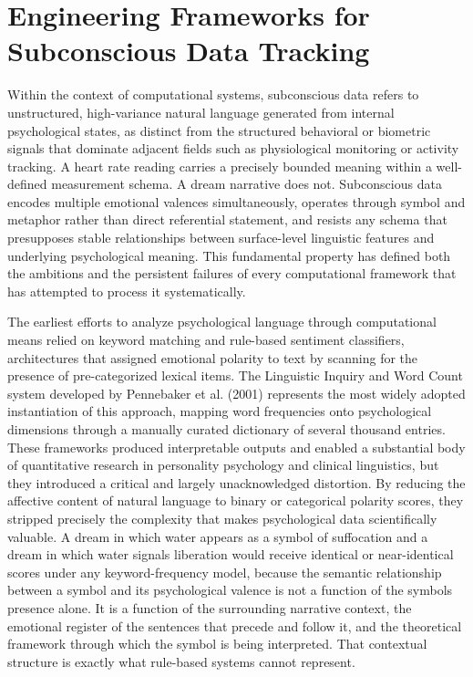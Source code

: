 \documentclass[12pt,a4paper]{report}
\begin{document}
\section{Engineering Frameworks for Subconscious Data Tracking}
Within the context of computational systems, \textquotedbl{}subconscious data\textquotedbl{} refers to unstructured, high-variance natural language generated from internal psychological states, as distinct from the structured behavioral or biometric signals that dominate adjacent fields such as physiological monitoring or activity tracking. A heart rate reading carries a precisely bounded meaning within a well-defined measurement schema. A dream narrative does not. Subconscious data encodes multiple emotional valences simultaneously, operates through symbol and metaphor rather than direct referential statement, and resists any schema that presupposes stable relationships between surface-level linguistic features and underlying psychological meaning. This fundamental property has defined both the ambitions and the persistent failures of every computational framework that has attempted to process it systematically.

The earliest efforts to analyze psychological language through computational means relied on keyword matching and rule-based sentiment classifiers, architectures that assigned emotional polarity to text by scanning for the presence of pre-categorized lexical items. The Linguistic Inquiry and Word Count system developed by Pennebaker et al. (2001) represents the most widely adopted instantiation of this approach, mapping word frequencies onto psychological dimensions through a manually curated dictionary of several thousand entries. These frameworks produced interpretable outputs and enabled a substantial body of quantitative research in personality psychology and clinical linguistics, but they introduced a critical and largely unacknowledged distortion. By reducing the affective content of natural language to binary or categorical polarity scores, they stripped precisely the complexity that makes psychological data scientifically valuable. A dream in which water appears as a symbol of suffocation and a dream in which water signals liberation would receive identical or near-identical scores under any keyword-frequency model, because the semantic relationship between a symbol and its psychological valence is not a function of the symbol\textquotesingle{}s presence alone. It is a function of the surrounding narrative context, the emotional register of the sentences that precede and follow it, and the theoretical framework through which the symbol is being interpreted. That contextual structure is exactly what rule-based systems cannot represent.
\end{document}
